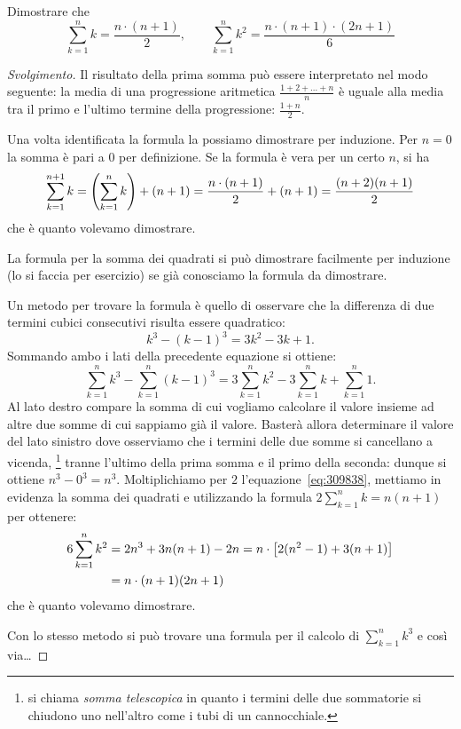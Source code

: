 \begin{exercise}
  Dimostrare che 
  \[
    \sum_{k=1}^n k = \frac{n\cdot (n+1)}{2}, \qquad
    \sum_{k=1}^n k^2 = \frac{n\cdot (n+1)\cdot (2n+1)}{6}
  \]
\end{exercise}
\begin{proof}[Svolgimento]
Il risultato della prima somma può essere interpretato nel modo seguente:
la media di una progressione aritmetica $\frac{1+2+ \dots + n}{n}$ 
è uguale alla media tra il primo 
e l'ultimo termine della progressione: $\frac{1+n}{2}$.

Una volta identificata la formula la possiamo dimostrare per induzione.
Per $n=0$ la somma è pari a $0$ per definizione.
Se la formula è vera per un certo $n$, si ha 
\[
  \sum_{k=1}^{n+1} k = {\left( \sum_{k=1}^n k \right)} + (n+1)
   = \frac{n\cdot(n+1)}{2} + (n+1) 
   = \frac{(n+2)(n+1)}{2}
\]
che è quanto volevamo dimostrare.

La formula per la somma dei quadrati si può dimostrare facilmente per 
induzione (lo si faccia per esercizio) se già conosciamo la formula da 
dimostrare.

Un metodo per trovare la formula è quello di osservare che la differenza 
di due termini cubici consecutivi risulta essere quadratico:
\[
k^3 - (k-1)^3 = 3 k^2 - 3k + 1.  
\]
Sommando ambo i lati della precedente equazione si ottiene:
\begin{equation}\label{eq:309838}
\sum_{k=1}^n k^3 - \sum_{k=1}^n (k-1)^3 = 3\sum_{k=1}^n k^2-3\sum_{k=1}^n k+\sum_{k=1}^n 1.
\end{equation}
Al lato destro compare la somma di cui vogliamo calcolare il valore 
insieme ad altre due somme di cui sappiamo già il valore. 
Basterà allora determinare il valore del lato sinistro dove 
osserviamo che i termini delle due somme si cancellano 
a vicenda,
\footnote{%
si chiama \emph{somma telescopica}
%
%
in quanto i termini delle due sommatorie si chiudono uno nell'altro 
come i tubi di un cannocchiale.} %
tranne l'ultimo della prima somma 
e il primo della seconda: dunque si ottiene $n^3 - 0^3=n^3$.
Moltiplichiamo per $2$ l'equazione~\eqref{eq:309838},
mettiamo in evidenza la somma dei quadrati e 
utilizzando la formula $2\sum_{k=1}^n k = n(n+1)$
per ottenere:
\begin{align*}
  6 \sum_{k=1}^n k^2 
  &=  2n^3 + 3 n(n+1) - 2n
  = n \cdot {\left[ 2(n^2-1) + 3(n+1) \right]}\\
  &= n \cdot (n+1)(2n+1)
\end{align*}
che è quanto volevamo dimostrare.

Con lo stesso metodo si può trovare una formula per il calcolo 
di $\sum_{k=1}^n k^3$ e così via\dots
\end{proof}

